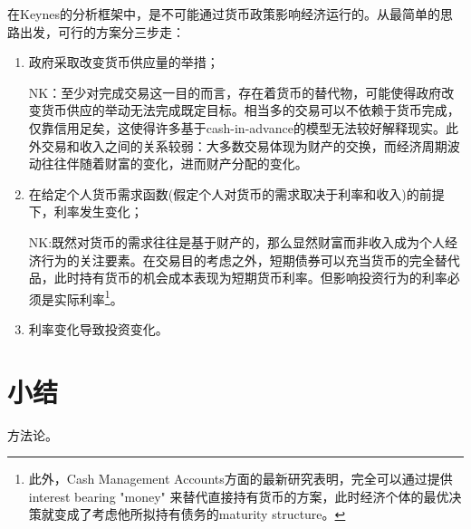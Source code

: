 在Keynes的分析框架中，是不可能通过货币政策影响经济运行的。从最简单的思路出发，可行的方案分三步走：
\begin{enumerate}
\item 政府采取改变货币供应量的举措；

NK：至少对完成交易这一目的而言，存在着货币的替代物，可能使得政府改变货币供应的举动无法完成既定目标。相当多的交易可以不依赖于货币完成，仅靠信用足矣，这使得许多基于cash-in-advance的模型无法较好解释现实。此外交易和收入之间的关系较弱：大多数交易体现为财产的交换，而经济周期波动往往伴随着财富的变化，进而财产分配的变化。
\item 在给定个人货币需求函数(假定个人对货币的需求取决于利率和收入)的前提下，利率发生变化；

NK:既然对货币的需求往往是基于财产的，那么显然财富而非收入成为个人经济行为的关注要素。在交易目的考虑之外，短期债券可以充当货币的完全替代品，此时持有货币的机会成本表现为短期货币利率。但影响投资行为的利率必须是实际利率\footnote{此外，Cash Management Accounts方面的最新研究表明，完全可以通过提供interest bearing "money" 来替代直接持有货币的方案，此时经济个体的最优决策就变成了考虑他所拟持有债务的maturity structure。}。



\item 利率变化导致投资变化。
\end{enumerate}

\section{小结}
\label{sec:KNK-K-concluding-remarks}
方法论。

